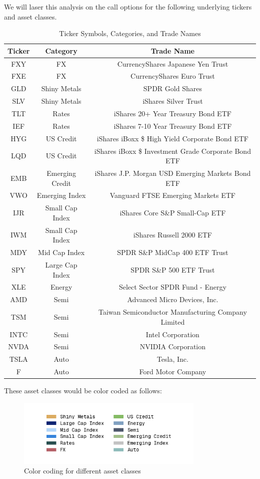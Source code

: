 We will laser this analysis on the call options for the following underlying tickers and asset classes. 
\begin{table}[h]
    \centering
    \begin{tabular}{|c|c|c|}
        \hline
        \textbf{Ticker} & \textbf{Category} & \textbf{Trade Name} \\
        \hline
        FXY & FX & CurrencyShares Japanese Yen Trust \\
        FXE & FX & CurrencyShares Euro Trust \\
        GLD & Shiny Metals & SPDR Gold Shares \\
        SLV & Shiny Metals & iShares Silver Trust \\
        TLT & Rates & iShares 20+ Year Treasury Bond ETF \\
        IEF & Rates & iShares 7-10 Year Treasury Bond ETF \\
        HYG & US Credit & iShares iBoxx \$ High Yield Corporate Bond ETF \\
        LQD & US Credit & iShares iBoxx \$ Investment Grade Corporate Bond ETF \\
        EMB & Emerging Credit & iShares J.P. Morgan USD Emerging Markets Bond ETF \\
        VWO & Emerging Index & Vanguard FTSE Emerging Markets ETF \\
        IJR & Small Cap Index & iShares Core S\&P Small-Cap ETF \\
        IWM & Small Cap Index & iShares Russell 2000 ETF \\
        MDY & Mid Cap Index & SPDR S\&P MidCap 400 ETF Trust \\
        SPY & Large Cap Index & SPDR S\&P 500 ETF Trust \\
        XLE & Energy & Select Sector SPDR Fund - Energy \\
        AMD & Semi & Advanced Micro Devices, Inc. \\
        TSM & Semi & Taiwan Semiconductor Manufacturing Company Limited \\
        INTC & Semi & Intel Corporation \\
        NVDA & Semi & NVIDIA Corporation \\
        TSLA & Auto & Tesla, Inc. \\
        F   & Auto & Ford Motor Company \\
        \hline
    \end{tabular}
    \caption{Ticker Symbols, Categories, and Trade Names}
    \label{tab:ticker_symbols}
\end{table}

These asset classes would be color coded as follows:

\begin{figure}[H]
    \centering
    \includegraphics[width=0.8\textwidth]{images/ticker_color_code.png}
    \caption{Color coding for different asset classes}
    \label{fig:asset_class_colors}
\end{figure}
